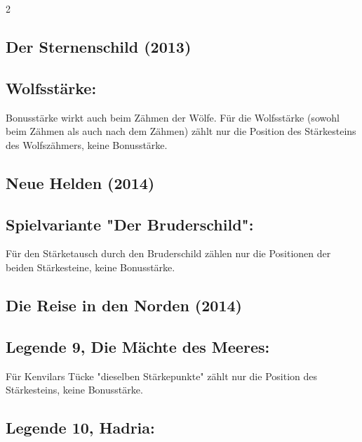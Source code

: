 \documentclass[10pt, a4paper, oneside]{book}
\begin{document}
\begin{multicols*}{2}
\begin{bgcolor}
\section{Der Sternenschild (2013)}

\subsection{Wolfsstärke:}

Bonusstärke wirkt auch beim Zähmen der Wölfe. Für die Wolfsstärke (sowohl beim Zähmen als auch nach dem Zähmen) zählt nur die Position des Stärkesteins des Wolfszähmers, keine Bonusstärke.
\supercite{StSch:FAQ}

\end{bgcolor}



\begin{nobgcolor}

\section{Neue Helden (2014)}


\subsection{Spielvariante "Der Bruderschild":}

Für den Stärketausch durch den Bruderschild zählen nur die Positionen der beiden Stärkesteine, keine Bonusstärke.


\end{nobgcolor}


\begin{bgcolor}
\section{Die Reise in den Norden (2014)}

\subsection{Legende 9, Die Mächte des Meeres:}

Für Kenvilars Tücke "dieselben Stärkepunkte" zählt nur die Position des Stärkesteins, keine Bonusstärke.
\supercite{DRidN9:Kenvilars_Tücke}


\subsection{Legende 10, Hadria:}


\end{bgcolor}
\end{multicols*}
\end{document}
